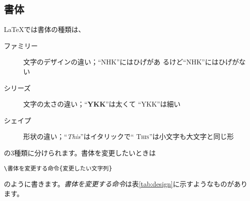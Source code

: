 \subsection{書体}
{\LaTeX}では書体の種類は、
\begin{description}
\item[ファミリー] 文字のデザインの違い；``{\rmfamily NHK}''にはひげがあ
	   るけど``{\sffamily NHK}''にはひげがない
\item[シリーズ] 文字の太さの違い；``{\bfseries YKK}''は太くて
	   ``{\mdseries YKK}''は細い
\item[シェイプ] 形状の違い；``{\itshape This}''はイタリックで``{\scshape 
	   This}''は小文字も大文字と同じ形
\end{description}
の3種類に分けられます。書体を変更したいときは
\begin{screen}
\begin{verbatim}
\書体を変更する命令{変更したい文字列}
\end{verbatim}
\end{screen}
のように書きます。\emph{書体を変更する命令}は表\ref{tab:design}に示すようなものがあります。

